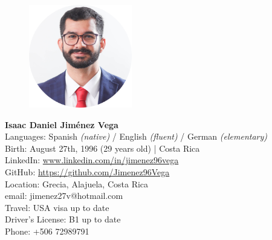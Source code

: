     \begin{figure}
        \includegraphics[width=4.5cm]{bild/Suit.png} \vspace{-4cm}
    \end{figure}
    
    \textbf{\LARGE{Isaac Daniel Jiménez Vega}}\vspace{0.5cm} \\    %
    \faBook \hspace{1mm} Languages: Spanish \textit{(native)} / English \textit{(fluent)} / German \textit{(elementary)}\\
    \faCalendar \hspace{1mm} Birth: August 27th, 1996 (29 years old) | Costa Rica \\
    \faLinkedin \hspace{1mm} LinkedIn: \url{www.linkedin.com/in/jimenez96vega}\\      %
    \faGithub \hspace{1mm} GitHub: \url{https://github.com/Jimenez96Vega}\\
    \faHome \hspace{1mm} Location: Grecia, Alajuela, Costa Rica\\   %
    \faAt \hspace{1mm} email: jimenez27v@hotmail.com\\        %
    \faPlane \hspace{1mm} Travel: USA visa up to date  \\
    \faAddressCard \hspace{0mm} Driver's License: B1 up to date\\                    %
    \faWhatsapp \hspace{1mm} Phone: +506 72989791\\                %
    
    

     




